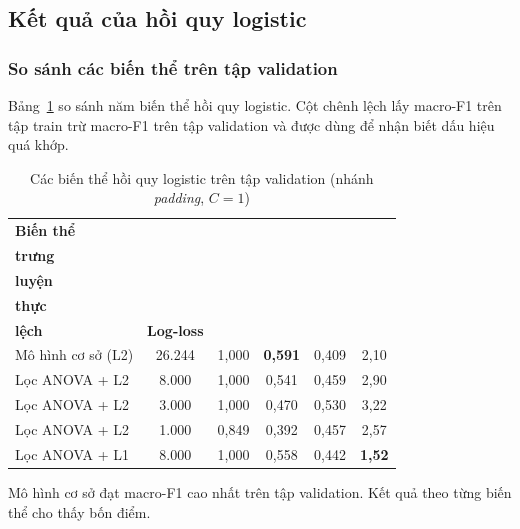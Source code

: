 \subsection{Kết quả của hồi quy logistic}

\subsubsection{So sánh các biến thể trên tập validation}

Bảng~\ref{tab:lr_val} so sánh năm biến thể hồi quy logistic. Cột chênh lệch lấy macro-F1 trên tập train trừ macro-F1 trên tập validation và được dùng để nhận biết dấu hiệu quá khớp.

\begin{table}[H]
\centering
\caption{Các biến thể hồi quy logistic trên tập validation (nhánh \emph{padding}, $C = 1$)}
\label{tab:lr_val}
\small
\begin{tabularx}{\linewidth}{@{}Xccccc@{}}
\toprule
\textbf{Biến thể} & \shortstack{\textbf{Số đặc}\\\textbf{trưng}} &
\shortstack{\textbf{F1 huấn}\\\textbf{luyện}} & \shortstack{\textbf{F1 xác}\\\textbf{thực}} &
\shortstack{\textbf{Chênh}\\\textbf{lệch}} & \textbf{Log-loss} \\
\midrule
Mô hình cơ sở (L2)       & 26.244 & 1,000 & \textbf{0,591} & 0,409 & 2,10 \\
Lọc ANOVA + L2           &  8.000 & 1,000 & 0,541 & 0,459 & 2,90 \\
Lọc ANOVA + L2           &  3.000 & 1,000 & 0,470 & 0,530 & 3,22 \\
Lọc ANOVA + L2           &  1.000 & 0,849 & 0,392 & 0,457 & 2,57 \\
Lọc ANOVA + L1           &  8.000 & 1,000 & 0,558 & 0,442 & \textbf{1,52} \\
\bottomrule
\end{tabularx}
\end{table}

Mô hình cơ sở đạt macro-F1 cao nhất trên tập validation. Kết quả theo từng biến thể cho thấy bốn điểm.

